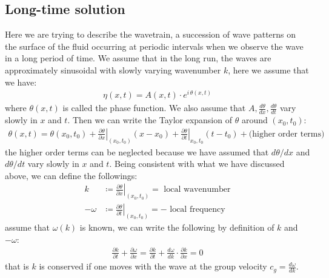 \documentclass[11pt]{book}
\theoremstyle{break}
\theoremstyle{break}
\begin{document}
\hfill\break

\subsection{Long-time solution}
Here we are trying to describe the wavetrain, a succession of wave patterns on the surface of the fluid occurring at periodic intervals when we observe the wave in a long period of time. We assume that in the long run, the waves are approximately sinusoidal with slowly varying wavenumber $k$, here we assume that we have:
\begin{align*}
\eta(x,t) = A(x,t)\cdot e^{i\,\theta(x,t)}
\end{align*}
where $\theta(x,t)$ is called the phase function. We also assume that $A,\frac{d\theta}{dx}, \frac{d\theta}{dt}$ vary slowly in $x$ and $t$. Then we can write the Taylor expansion of $\theta$ around $(x_0,t_0)$:
\begin{align*}
\theta(x,t) = \theta(x_0 , t_0) + \left.\frac{\partial \theta}{\partial x}\right|_{(x_0,t_0)}(x-x_0) + \left.\frac{\partial \theta}{\partial t}\right|_{x_0,t_0}(t-t_0) + \text{(higher order terms)}
\end{align*}
the higher order terms can be neglected because we have assumed that $d\theta/dx$ and $d\theta/dt$ vary slowly in $x$ and $t$. Being consistent with what we have discussed above, we can define the followings:
\begin{align*}
k &\coloneqq \left.\frac{\partial \theta}{\partial x}\right|_{(x_0,t_0)} = \text{ local wavenumber}\\
-\omega &\coloneqq \left.\frac{\partial \theta}{\partial t}\right|_{(x_0,t_0)} = -\text{ local frequency}
\end{align*}
assume that $\omega(k)$ is known, we can write the following by definition of $k$ and $-\omega$:
\begin{align*}
\frac{\partial k}{\partial t} + \frac{\partial \omega}{\partial x} =\frac{\partial k}{\partial t} + \frac{d \omega}{d k}\cdot \frac{\partial k}{\partial x}  =0
\end{align*}
that is $k$ is conserved if one moves with the wave at the group velocity $c_g = \frac{d\omega}{dk}$. \\
\end{document}
